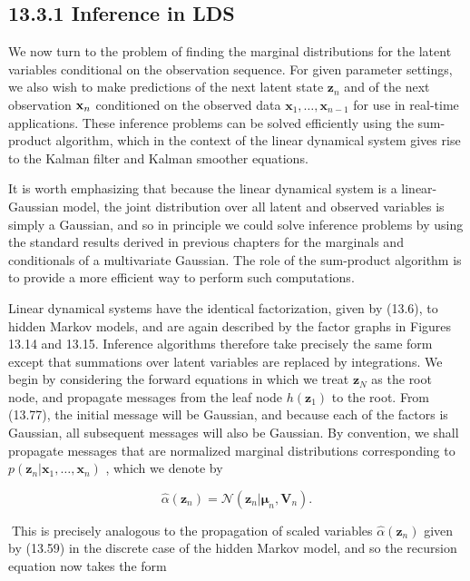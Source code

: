 \documentclass[
  10
]{article}
\begin{document}
\subsection{13.3.1 Inference in LDS}\label{inference-in-lds}

We now turn to the problem of finding the marginal distributions for the
latent variables conditional on the observation sequence. For given
parameter settings, we also wish to make predictions of the next latent
state \(\mathbf { z } _ { n }\) and of the next observation
\({ \bf x } _ { n }\) conditioned on the observed data
\(\mathbf { x } _ { 1 } , \ldots , \mathbf { x } _ { n - 1 }\) for use
in real-time applications. These inference problems can be solved
efficiently using the sum-product algorithm, which in the context of the
linear dynamical system gives rise to the Kalman filter and Kalman
smoother equations.

It is worth emphasizing that because the linear dynamical system is a
linear-Gaussian model, the joint distribution over all latent and
observed variables is simply a Gaussian, and so in principle we could
solve inference problems by using the standard results derived in
previous chapters for the marginals and conditionals of a multivariate
Gaussian. The role of the sum-product algorithm is to provide a more
efficient way to perform such computations.

Linear dynamical systems have the identical factorization, given by
(13.6), to hidden Markov models, and are again described by the factor
graphs in Figures 13.14 and 13.15. Inference algorithms therefore take
precisely the same form except that summations over latent variables are
replaced by integrations. We begin by considering the forward equations
in which we treat \(\mathbf { z } _ { N }\) as the root node, and
propagate messages from the leaf node \(h ( \mathbf { z } _ { 1 } )\) to
the root. From (13.77), the initial message will be Gaussian, and
because each of the factors is Gaussian, all subsequent messages will
also be Gaussian. By convention, we shall propagate messages that are
normalized marginal distributions corresponding to
\(p ( \mathbf { z } _ { n } | \mathbf { x } _ { 1 } , \ldots , \mathbf { x } _ { n } )\)
, which we denote by

\[
\widehat {\alpha} (\mathbf {z} _ {n}) = \mathcal {N} (\mathbf {z} _ {n} | \boldsymbol {\mu} _ {n}, \mathbf {V} _ {n}).\tag{13.84}
\]

This is precisely analogous to the propagation of scaled variables
\(\widehat { \alpha } ( \mathbf { z } _ { n } )\) given by (13.59) in
the discrete case of the hidden Markov model, and so the recursion
equation now takes the form
\end{document}
